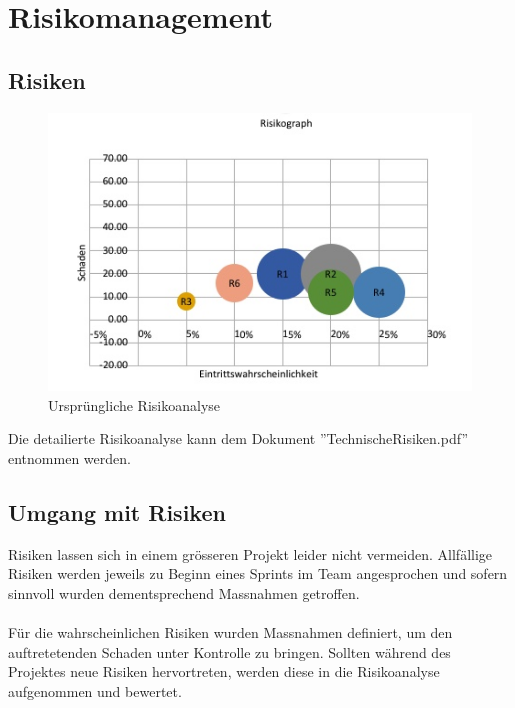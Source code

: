 \section{Risikomanagement}

\subsection{Risiken}
\begin{figure}[H]
	\includegraphics[width=\textwidth,height=\textheight,keepaspectratio]{images/Risikoanalyse_vorher.png}
	\caption{Ursprüngliche Risikoanalyse}
\end{figure}

\noindent Die detailierte Risikoanalyse kann dem Dokument ''TechnischeRisiken.pdf'' entnommen werden.

\subsection{Umgang mit Risiken}
Risiken lassen sich in einem grösseren Projekt leider nicht vermeiden. Allfällige Risiken werden jeweils zu Beginn eines Sprints im Team angesprochen und sofern sinnvoll wurden dementsprechend Massnahmen getroffen.
\\
\\
Für die wahrscheinlichen Risiken wurden Massnahmen definiert, um den auftretetenden Schaden unter Kontrolle zu bringen. Sollten während des Projektes neue Risiken hervortreten, werden diese in die Risikoanalyse aufgenommen und bewertet.

\newpage